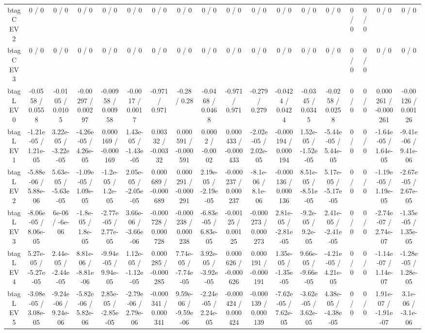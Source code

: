 \documentclass[10pt]{article}
\begin{document}
\begin{table}[htbp]
\begin{center}
\begin{tabular}{|c|c|c|c|c|c|c|c|c|c|c|c|c|c|c|c|c|c|}
  btag C EV 2 & 0 / 0 & 0 / 0 & 0 / 0 & 0 / 0 & 0 / 0 & 0 / 0 & 0 / 0 & 0 / 0 & 0 / 0 & 0 / 0 & 0 / 0 & 0 / 0 & 0 / 0 & 0 / 0 & 0 / 0 & 0 / 0 & 0 / 0 \\ 
  btag C EV 3 & 0 / 0 & 0 / 0 & 0 / 0 & 0 / 0 & 0 / 0 & 0 / 0 & 0 / 0 & 0 / 0 & 0 / 0 & 0 / 0 & 0 / 0 & 0 / 0 & 0 / 0 & 0 / 0 & 0 / 0 & 0 / 0 & 0 / 0 \\ 
  btag L EV 0 & -0.0558 / 0.0558 & -0.0105 / 0.0105 & -0.00297 / 0.00297 & -0.00958 / 0.00958 & -0.0017 / 0.0017 & -0.971 / 0.971 & -0.28 / 0.28 & -0.0468 / 0.0468 & -0.971 / 0.971 & -0.279 / 0.279 & -0.0424 / 0.0424 & -0.0345 / 0.0345 & -0.0258 / 0.0258 & 0 / 0 & 0 / 0 & 0.000261 / -0.000261 & -0.00126 / 0.00126 \\ 
  btag L EV 1 & -1.21e-05 / 1.21e-05 & 3.22e-05 / -3.22e-05 & -4.26e-05 / 4.26e-05 & 0.000169 / -0.000169 & 1.43e-05 / -1.43e-05 & 0.00332 / -0.00332 & 0.000591 / -0.000591 & 0.0002 / -0.0002 & 0.000433 / -0.000433 & -2.02e-05 / 2.02e-05 & -0.000194 / 0.000194 & 1.52e-05 / -1.52e-05 & -5.44e-05 / 5.44e-05 & 0 / 0 & 0 / 0 & -1.64e-05 / 1.64e-05 & -9.41e-06 / 9.41e-06 \\ 
  btag L EV 2 & -5.88e-06 / 5.88e-06 & 5.63e-05 / -5.63e-05 & -1.09e-05 / 1.09e-05 & -1.2e-05 / 1.2e-05 & 2.05e-05 / -2.05e-05 & 0.000689 / -0.000689 & 0.000291 / -0.000291 & 2.19e-05 / -2.19e-05 & -0.000237 / 0.000237 & -8.1e-06 / 8.1e-06 & -0.000136 / 0.000136 & 8.51e-05 / -8.51e-05 & 5.17e-05 / -5.17e-05 & 0 / 0 & 0 / 0 & -1.19e-05 / 1.19e-05 & -2.67e-05 / 2.67e-05 \\ 
  btag L EV 3 & -8.06e-05 / 8.06e-05 & 6e-06 / -6e-06 & -1.8e-05 / 1.8e-05 & -2.77e-05 / 2.77e-05 & 3.66e-06 / -3.66e-06 & -0.000728 / 0.000728 & -0.000238 / 0.000238 & -6.83e-05 / 6.83e-05 & -0.00125 / 0.00125 & -0.000273 / 0.000273 & 2.81e-05 / -2.81e-05 & -9.2e-05 / 9.2e-05 & 2.41e-05 / -2.41e-05 & 0 / 0 & 0 / 0 & -2.74e-07 / 2.74e-07 & -1.35e-05 / 1.35e-05 \\ 
  btag L EV 4 & 5.27e-05 / -5.27e-05 & 2.44e-05 / -2.44e-05 & 8.81e-06 / -8.81e-06 & -9.94e-05 / 9.94e-05 & 1.12e-05 / -1.12e-05 & 0.000285 / -0.000285 & 7.74e-05 / -7.74e-05 & 3.92e-05 / -3.92e-05 & 0.000626 / -0.000626 & 0.000191 / -0.000191 & 1.35e-05 / -1.35e-05 & 9.66e-05 / -9.66e-05 & -4.21e-05 / 4.21e-05 & 0 / 0 & 0 / 0 & -1.14e-07 / 1.14e-07 & -1.28e-05 / 1.28e-05 \\ 
  btag L EV 5 & -3.08e-05 / 3.08e-05 & -9.24e-06 / 9.24e-06 & -5.82e-06 / 5.82e-06 & 2.85e-05 / -2.85e-05 & -2.79e-06 / 2.79e-06 & -0.000341 / 0.000341 & 9.59e-06 / -9.59e-06 & -2.24e-05 / 2.24e-05 & -0.000424 / 0.000424 & -0.000139 / 0.000139 & -7.62e-05 / 7.62e-05 & -3.62e-05 / 3.62e-05 & 4.38e-05 / -4.38e-05 & 0 / 0 & 0 / 0 & 1.91e-07 / -1.91e-07 & 3.1e-06 / -3.1e-06 \\ 

\end{tabular}
\end{center}
\end{table}
\end{document}
